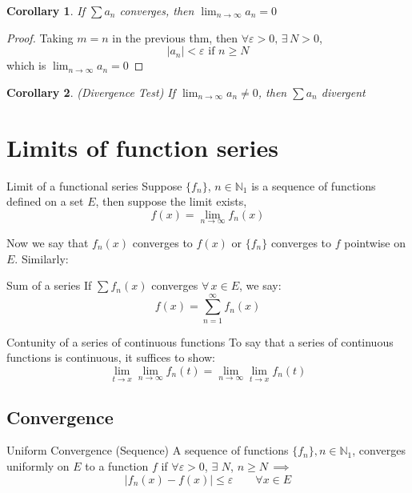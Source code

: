 \documentclass{article}
\newcommand{\N}{\mathbb{N}}
\newcommand{\e}{\varepsilon}
\newcommand{\ex}{\exists\,}
\newtheorem{corollary}{Corollary}
\begin{document}
{{{{\noindent\begin{corollary}{}{}
  If $\sum a_n$ converges, then $\displaystyle{\lim_{n\to\infty}{a_n} = 0}$
\end{corollary}\vspace{10pt}
\begin{proof}
  Taking $m = n$ in the previous thm, then $\forall\e > 0,\,\ex N > 0$,
  $$ |a_n| < \e \text{ if } n \ge N $$
  which is $\displaystyle{\lim_{n\to\infty}{a_n} = 0}$
\end{proof}

\noindent\begin{corollary}({Divergence Test}){}
  If $\displaystyle{\lim_{n\to\infty}{a_n}\neq 0}$, then $\sum a_n$ divergent
\end{corollary}\vspace{10pt}



\section{Limits of function series}

\noindent\begin{definition}{Limit of a functional series}{}
 Suppose $\{ f_n \}$, $n\in\N_1$ is a sequence of functions defined on a set $E$, then suppose the limit exists,
 $$ f(x) = \lim_{n\to\infty}{f_n(x)} $$
\end{definition}\vspace{10pt}

Now we say that $f_n(x)$ converges to $f(x)$ or $\{ f_n \}$ converges to $f$ pointwise on $E$. Similarly:

\noindent\begin{definition}{Sum of a series}{}
   If $\sum f_n(x)$ converges $\forall\, x\in E$, we say:
   $$ f(x) = \sum_{n =1}^\infty {f_n(x)} $$
\end{definition}\vspace{10pt}

\noindent\begin{theorem}{Contunity of a series of continuous functions}{}
  To say that a series of continuous functions is continuous, it suffices to show:
  $$ \lim_{t\to x}{\lim_{n \to \infty}{f_n(t)}} = \lim_{n \to \infty}{\lim_{t\to x}{f_n(t)}}  $$
\end{theorem}\vspace{10pt}


\subsection{Convergence}
\noindent\begin{definition}{Uniform Convergence (Sequence)}{}
   A sequence of functions $\{f_n\}, n\in\N_1$, converges uniformly on $E$ to a function $f$ if $\forall \e>0$, $\ex\,N$, $n \geq N\, \implies$
   $$ |f_n(x) - f(x)| \le \e \qquad \forall x \in E$$
\end{definition}\vspace{10pt}

}}}}
\end{document}

